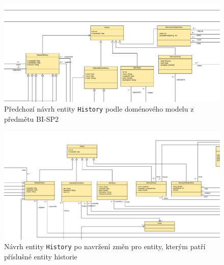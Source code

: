     \begin{figure}\centering
        \includegraphics[angle=90, height=0.9\textheight]{pdfs/History1}
        \caption[Předešlý návrh entity \texttt{History}]{Předchozí návrh entity \texttt{History} podle doménového modelu z předmětu BI-SP2}\label{image:History1}
    \end{figure}
    \begin{figure}\centering
        \includegraphics[angle=90, height=0.9\textheight]{pdfs/History1_2}
        \caption[Návrh entity \texttt{History} po změnách návrhu]{Návrh entity \texttt{History} po navržení změn pro entity, kterým patří příslušné entity historie}\label{image:History1_2}
    \end{figure}

